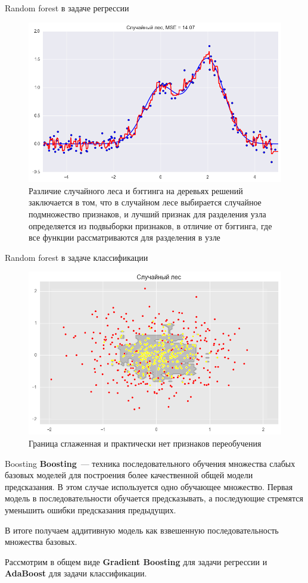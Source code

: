 \documentclass[notheorems, handout]{beamer}
\begin{document}
\begin{frame}{Random forest в задаче регрессии}
	\begin{figure}[h!]
		\includegraphics[width=0.8 \textwidth]{img/rf_re}
		\caption{Различие случайного леса и бэггинга на деревьях решений заключается в том, что в случайном лесе выбирается случайное подмножество признаков, и лучший признак для разделения узла определяется из подвыборки признаков, в отличие от бэггинга, где все функции рассматриваются для разделения в узле}
	\end{figure}
\end{frame}

\begin{frame}{Random forest в задаче классификации}
	\begin{figure}[h!]
		\includegraphics[width=1 \textwidth]{img/rf_cl}
		\caption{Граница сглаженная и практически нет признаков переобучения}
	\end{figure}
\end{frame}

\begin{frame}{Boosting}
	\textbf{Boosting}~--- техника последовательного обучения множества слабых базовых моделей для построения более качественной общей модели предсказания. В этом случае используется одно обучающее множество. Первая модель в последовательности обучается предсказывать, а последующие стремятся уменьшить ошибки предсказания предыдущих. 
	\par\smallskip
	В итоге получаем аддитивную модель как взвешенную последовательность множества базовых.
	\par\smallskip
	Рассмотрим в общем виде \textbf{Gradient Boosting} для задачи регрессии и \textbf{AdaBoost} для задачи классификации.
\end{frame}
\end{document}
